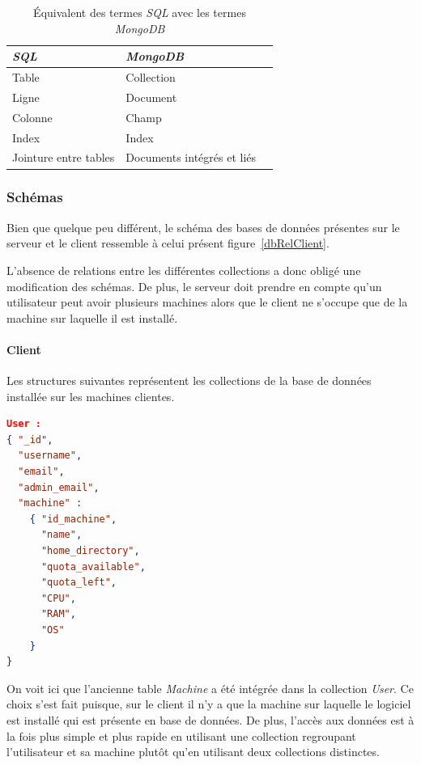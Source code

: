 \documentclass[a4paper,10pt, twoside]{report}
\begin{document}
\begin{spacing}{1.2}
\begin{table}[h!]
  \centering
  \def\arraystretch{1.5}
  \setlength{\fboxsep}{13pt} %
  \setlength{\fboxrule}{0pt} %
  \begin{tabular}{lm{6cm}m{6cm}}
   \rowcolor{arkred} 
    \arrayrulecolor{gray73}\hline
    \color{white} \textbf{\textit{SQL}} &
    \color{white} \textbf{\textit{MongoDB}}\\
    \hline
    Table & Collection\\
    \hline
    Ligne & Document\\
    \hline
    Colonne & Champ\\
    \hline
    Index & Index\\
    \hline
    Jointure entre tables & Documents int\'egr\'es et li\'es
  \end{tabular}
  \caption{\label{tabMappSQLMongoTerms} \'Equivalent des termes \textit{SQL}
  avec les termes \textit{MongoDB}}
\end{table}

\subsubsection{Sch\'emas}
Bien que quelque peu diff\'erent, le sch\'ema des bases de donn\'ees
pr\'esentes sur le serveur et le client ressemble \`a celui pr\'esent
figure~\ref{dbRelClient}.

L'absence de relations entre les diff\'erentes collections a donc oblig\'e une
modification des sch\'emas. De plus, le serveur doit prendre en compte qu'un
utilisateur peut avoir plusieurs machines alors que le client ne s'occupe que
de la machine sur laquelle il est install\'e.

\paragraph{Client\\}
Les structures suivantes repr\'esentent les collections de la base de donn\'ees
install\'ee sur les machines clientes.

\begin{lstlisting}[language=json]
User :
{ "_id",
  "username",
  "email",
  "admin_email",
  "machine" :
    { "id_machine",
      "name",
      "home_directory",
      "quota_available",
      "quota_left",
      "CPU",
      "RAM",
      "OS"
    }
}
\end{lstlisting}

On voit ici que l'ancienne table \textit{Machine} a \'et\'e int\'egr\'ee dans
la collection \textit{User}. Ce choix s'est fait puisque, sur le client
il n'y a que la machine sur laquelle le logiciel est install\'e qui est
pr\'esente en base de donn\'ees. De plus, l'acc\`es aux donn\'ees est \`a la
fois plus simple et plus rapide en utilisant une collection regroupant
l'utilisateur et sa machine plut\^ot qu'en utilisant deux collections
distinctes.


\end{spacing}
\end{document}
